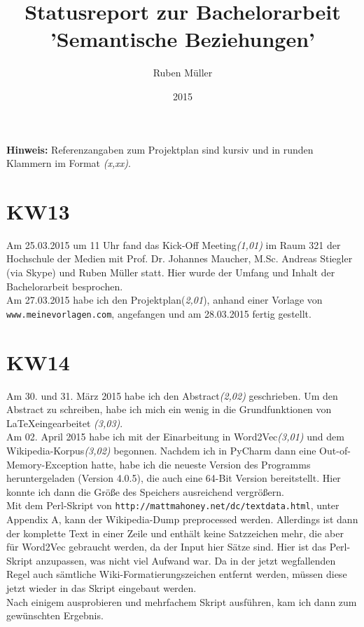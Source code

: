 \documentclass[11pt,a4paper]{article}
\begin{document}
\title{Statusreport zur Bachelorarbeit 'Semantische Beziehungen'}
\date{2015}
\author{Ruben Müller}
\maketitle

\textbf{Hinweis:} Referenzangaben zum Projektplan sind kursiv und in runden Klammern im Format \textit{(x,xx)}.
\section*{KW13}
Am 25.03.2015 um 11 Uhr fand das Kick-Off Meeting\textit{(1,01)} im Raum 321 der Hochschule der Medien  mit Prof. Dr. Johannes Maucher, M.Sc. Andreas Stiegler (via Skype) und Ruben Müller statt. Hier wurde der Umfang und Inhalt der Bachelorarbeit besprochen.
\\Am 27.03.2015 habe ich den Projektplan(\textit{2,01}), anhand einer Vorlage von \\\texttt{www.meinevorlagen.com}, angefangen und am 28.03.2015 fertig gestellt. 
\section*{KW14}
Am 30. und 31. März 2015 habe ich den Abstract\textit{(2,02)} geschrieben. Um den Abstract zu schreiben, habe ich mich ein wenig in die Grundfunktionen von \LaTeX eingearbeitet \textit{(3,03)}.
\\Am 02. April 2015 habe ich mit der Einarbeitung in Word2Vec\textit{(3,01)} und dem Wikipedia-Korpus\textit{(3,02)} begonnen. Nachdem ich in PyCharm dann eine Out-of-Memory-Exception hatte, habe ich die neueste Version des Programms heruntergeladen (Version 4.0.5), die auch eine 64-Bit Version bereitstellt. Hier konnte ich dann die Größe des Speichers ausreichend vergrößern. 
\\Mit dem Perl-Skript von \texttt{http://mattmahoney.net/dc/textdata.html}, unter Appendix A, kann der Wikipedia-Dump preprocessed werden. Allerdings ist dann der komplette Text in einer Zeile und enthält keine Satzzeichen mehr, die aber für Word2Vec gebraucht werden, da der Input hier Sätze sind. Hier ist das Perl-Skript anzupassen, was nicht viel Aufwand war. Da in der jetzt wegfallenden Regel auch sämtliche Wiki-Formatierungszeichen entfernt werden, müssen diese jetzt wieder in das Skript eingebaut werden.
\\Nach einigem ausprobieren und mehrfachem Skript ausführen, kam ich dann zum gewünschten Ergebnis.
\end{document}
